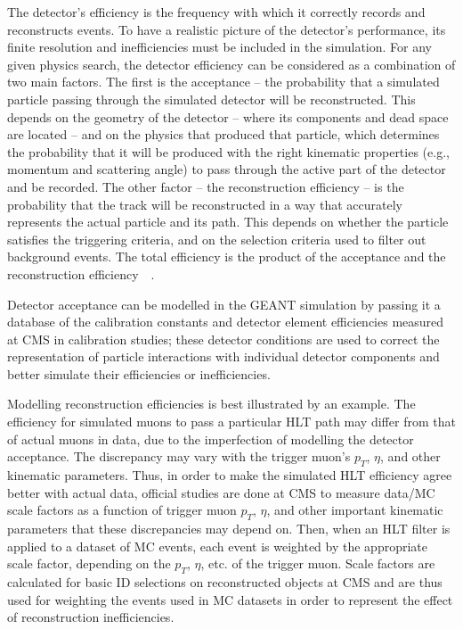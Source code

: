 The detector's efficiency is the frequency with which it correctly records and reconstructs events. To have a realistic picture of the detector's performance, its finite resolution and inefficiencies must be included in the simulation. For any given physics search, the detector efficiency can be considered as a combination of two main factors. The first is the acceptance -- the probability that a simulated particle passing through the simulated detector will be reconstructed. This depends on the geometry of the detector -- where its components and dead space are located -- and on the physics that produced that particle, which determines the probability that it will be produced with the right kinematic properties (e.g., momentum and scattering angle) to pass through the active part of the detector and be recorded. The other factor -- the reconstruction efficiency -- is the probability that the track will be reconstructed in a way that accurately represents the actual particle and its path. This depends on whether the particle satisfies the triggering criteria, and on the selection criteria used to filter out background events. The total efficiency is the product of the acceptance and the reconstruction efficiency~\cite{CMS:2010mua}~\cite{Chatrchyan:2012rga}.

Detector acceptance can be modelled in the GEANT simulation by passing it a database of the calibration constants and detector element efficiencies measured at CMS in calibration studies; these detector conditions are used to correct the representation of particle interactions with individual detector components and better simulate their efficiencies or inefficiencies.

Modelling reconstruction efficiencies is best illustrated by an example. The efficiency for simulated muons to pass a particular HLT path may differ from that of actual muons in data, due to the imperfection of modelling the detector acceptance. The discrepancy may vary with the trigger muon's $p_T$, $\eta$, and other kinematic parameters. Thus, in order to make the simulated HLT efficiency agree better with actual data, official studies are done at CMS to measure data/MC scale factors as a function of trigger muon $p_T$, $\eta$, and other important kinematic parameters that these discrepancies may depend on. Then, when an HLT filter is applied to a dataset of MC events, each event is weighted by the appropriate scale factor, depending on the $p_T$, $\eta$, etc. of the trigger muon. Scale factors are calculated for basic ID selections on reconstructed objects at CMS and are thus used for weighting the events used in MC datasets in order to represent the effect of reconstruction inefficiencies.
